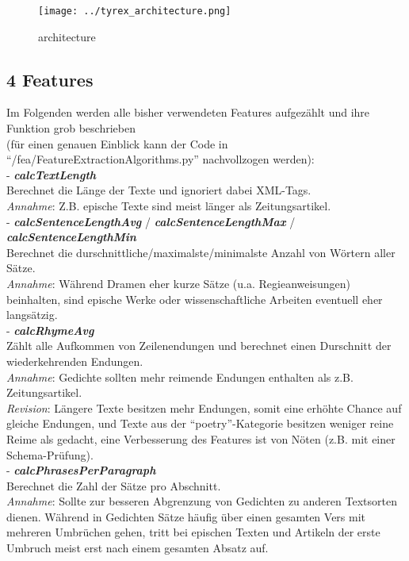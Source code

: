 \documentclass[]{article}
\begin{document}
\begin{figure}[htbp]
\centering
\texttt{[image: ../tyrex\_architecture.png]}
\caption{architecture}
\end{figure}

\subsection{4 Features}\label{features}

Im Folgenden werden alle bisher verwendeten Features aufgezählt und ihre
Funktion grob beschrieben\\
(für einen genauen Einblick kann der Code in
``/fea/FeatureExtractionAlgorithms.py'' nachvollzogen werden):\\
- \textbf{\emph{calcTextLength}}\\
Berechnet die Länge der Texte und ignoriert dabei XML-Tags.\\
\emph{Annahme}: Z.B. epische Texte sind meist länger als
Zeitungsartikel.\\
- \textbf{\emph{calcSentenceLengthAvg}} /
\textbf{\emph{calcSentenceLengthMax}} /
\textbf{\emph{calcSentenceLengthMin}}\\
Berechnet die durschnittliche/maximalste/minimalste Anzahl von Wörtern
aller Sätze.\\
\emph{Annahme}: Während Dramen eher kurze Sätze (u.a. Regieanweisungen)
beinhalten, sind epische Werke oder wissenschaftliche Arbeiten eventuell
eher langsätzig.\\
- \textbf{\emph{calcRhymeAvg}}\\
Zählt alle Aufkommen von Zeilenendungen und berechnet einen Durschnitt
der wiederkehrenden Endungen.\\
\emph{Annahme}: Gedichte sollten mehr reimende Endungen enthalten als
z.B. Zeitungsartikel.\\
\emph{Revision}: Längere Texte besitzen mehr Endungen, somit eine
erhöhte Chance auf gleiche Endungen, und Texte aus der
``poetry''-Kategorie besitzen weniger reine Reime als gedacht, eine
Verbesserung des Features ist von Nöten (z.B. mit einer
Schema-Prüfung).\\
- \textbf{\emph{calcPhrasesPerParagraph}}\\
Berechnet die Zahl der Sätze pro Abschnitt.\\
\emph{Annahme}: Sollte zur besseren Abgrenzung von Gedichten zu anderen
Textsorten dienen. Während in Gedichten Sätze häufig über einen gesamten
Vers mit mehreren Umbrüchen gehen, tritt bei epischen Texten und
Artikeln der erste Umbruch meist erst nach einem gesamten Absatz auf.\\
\end{document}
